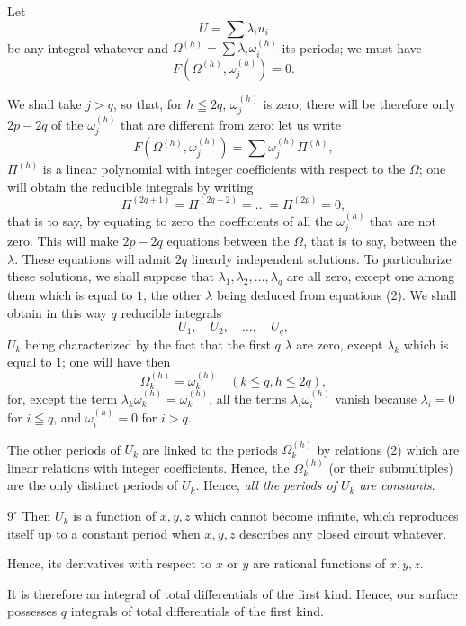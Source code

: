 \documentclass{article}
\begin{document}
Let
\[
U = \sum \lambda_{i} u_{i}
\]
be any integral whatever and $\Omega^{(h)} = \displaystyle\sum \lambda_{i} \omega_{i}^{(h)}$ its periods; we must have
\[
F(\Omega^{(h)}, \omega_{j}^{(h)}) = 0.
\]

We shall take $j > q$, so that, for $h \leqq 2q$, $\omega_{j}^{(h)}$ is zero; there will be therefore only $2p - 2q$ of the $\omega_{j}^{(h)}$ that are different from zero;
let us write
\[
F(\Omega^{(h)}, \omega_{j}^{(h)}) = \sum \omega_{j}^{(h)} \Pi^{(h)},
\]
$\Pi^{(h)}$ is a linear polynomial with integer coefficients with respect to the $\Omega$; one will obtain the reducible integrals by writing
\[
\Pi^{(2q+1)} = \Pi^{(2q+2)} = \ldots = \Pi^{(2p)} = 0, \tag{2}
\]
that is to say, by equating to zero the coefficients of all the $\omega_{j}^{(h)}$ that are not zero. This will make $2p - 2q$ equations between the $\Omega$, that is to say, between the $\lambda$. These equations will admit $2q$ linearly independent solutions. To particularize these solutions, we shall suppose that $\lambda_{1}, \lambda_{2}, \ldots, \lambda_{q}$ are all zero, except one among them which is equal to $1$, the other $\lambda$ being deduced from equations (2). We shall obtain in this way $q$ reducible integrals
\[
U_{1}, \quad U_{2}, \quad \ldots, \quad U_{q},
\]
$U_{k}$ being characterized by the fact that the first $q$ $\lambda$ are zero, except $\lambda_{k}$ which is equal to $1$; one will have then
\[
\Omega_{k}^{(h)} = \omega_{k}^{(h)} \quad (k \leqq q, h \leqq 2q),
\]
for, except the term $\lambda_{k} \omega_{k}^{(h)} = \omega_{k}^{(h)}$, all the terms $\lambda_{i} \omega_{i}^{(h)}$ vanish because $\lambda_{i} = 0$ for $i \leqq q$, and $\omega_{i}^{(h)} = 0$ for $i > q$.

The other periods of $U_{k}$ are linked to the periods $\Omega_{k}^{(h)}$ by relations (2) which are linear relations with integer coefficients. Hence, the $\Omega_{k}^{(h)}$ (or their submultiples) are the only distinct periods of $U_{k}$. Hence, \emph{all the periods of $U_{k}$ are constants}.

$9^\circ$ Then $U_{k}$ is a function of $x, y, z$ which cannot become infinite, which reproduces itself up to a constant period when $x, y, z$ describes any closed circuit whatever.

Hence, its derivatives with respect to $x$ or $y$ are rational functions of $x, y, z$.

It is therefore an integral of total differentials of the first kind. Hence, our surface possesses $q$ integrals of total differentials of the first kind.
\end{document}
